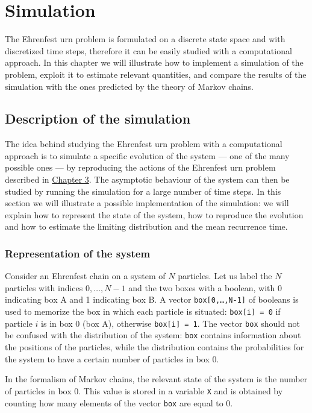 \chapter{Simulation}
The Ehrenfest urn problem is formulated on a discrete state space and with discretized time steps, therefore it can be easily studied with a computational approach. In this chapter we will illustrate how to implement a simulation of the problem, exploit it to estimate relevant quantities, and compare the results of the simulation with the ones predicted by the theory of Markov chains.

\section{Description of the simulation}
The idea behind studying the Ehrenfest urn problem with a computational approach is to simulate a specific evolution of the system --- one of the many possible ones --- by reproducing the actions of the Ehrenfest urn problem described in \hyperref[ch:3]{Chapter 3}. The asymptotic behaviour of the system can then be studied by running the simulation for a large number of time steps. In this section we will illustrate a possible implementation of the simulation: we will explain how to represent the state of the system, how to reproduce the evolution and how to estimate the limiting distribution and the mean recurrence time.

\subsection{Representation of the system}
Consider an Ehrenfest chain on a system of $N$ particles. Let us label the $N$ particles with indices $0, \dots,N-1$ and the two boxes with a boolean, with 0 indicating box A and 1 indicating box B. A vector \texttt{box[0,\dots,N-1]} of booleans is used to memorize the box in which each particle is situated: \texttt{box[i] = 0} if particle $i$ is in box 0 (\ie box A), otherwise \texttt{box[i] = 1}. The vector \texttt{box} should not be confused with the distribution of the system: \texttt{box} contains information about the positions of the particles, while the distribution contains the probabilities for the system to have a certain number of particles in box 0.

In the formalism of Markov chains, the relevant state of the system is the number of particles in box 0. This value is stored in a variable \texttt{X} and is obtained by counting how many elements of the vector \texttt{box} are equal to 0. 


